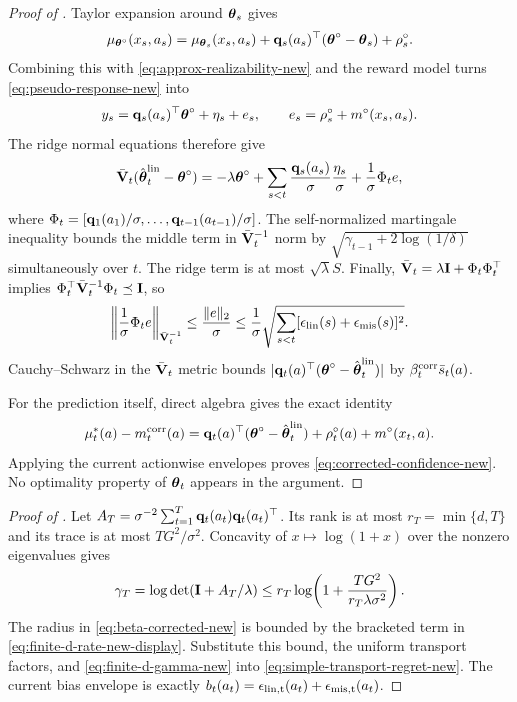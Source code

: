 \begin{proof}[Proof of ]
Taylor expansion around $\boldsymbol{\theta}_s$ gives
\[
 \mu_{\boldsymbol{\theta}^\circ}(x_s,a_s)
 =\mu_{\boldsymbol{\theta}_s}(x_s,a_s)
 +\mathbf{q}_s(a_s)^\top(\boldsymbol{\theta}^\circ-\boldsymbol{\theta}_s)+\rho_s^\circ.
\]
Combining this with \eqref{eq:approx-realizability-new} and the reward model
turns \eqref{eq:pseudo-response-new} into
\[
 y_s=\mathbf{q}_s(a_s)^\top\boldsymbol{\theta}^\circ+\eta_s+e_s,
 \qquad e_s=\rho_s^\circ+m^\circ(x_s,a_s).
\]
The ridge normal equations therefore give
\begin{equation}\label{eq:corrected-normal-equation-proof}
 \bar{\mathbf{V}}_t(\hat{\boldsymbol{\theta}}_t^{\rm lin}-\boldsymbol{\theta}^\circ)
 =-\lambda\boldsymbol{\theta}^\circ
 +\sum_{s<t}\frac{\mathbf{q}_s(a_s)}{\sigma}\frac{\eta_s}{\sigma}
 +\frac1\sigma\Phi_t e,
\end{equation}
where $\Phi_t=[\mathbf{q}_1(a_1)/\sigma,\ldots,
\mathbf{q}_{t-1}(a_{t-1})/\sigma]$.  The self-normalized martingale inequality
bounds the middle term in $\bar{\mathbf{V}}_t^{-1}$ norm by
$\sqrt{\gamma_{t-1}+2\log(1/\delta)}$ simultaneously over $t$.  The ridge
term is at most $\sqrt\lambda S$.  Finally,
$\bar{\mathbf{V}}_t=\lambda\mathbf{I}+\Phi_t\Phi_t^\top$ implies
$\Phi_t^\top\bar{\mathbf{V}}_t^{-1}\Phi_t\preceq\mathbf{I}$, so
\[
 \left\|\frac1\sigma\Phi_t e\right\|_{\bar{\mathbf{V}}_t^{-1}}
 \le\frac{\|e\|_2}{\sigma}
 \le\frac1\sigma\sqrt{\sum_{s<t}
 [\epsilon_{\rm lin}(s)+\epsilon_{\rm mis}(s)]^2}.
\]
Cauchy--Schwarz in the $\bar{\mathbf{V}}_t$ metric bounds
$|\mathbf{q}_t(a)^\top(\boldsymbol{\theta}^\circ-\hat{\boldsymbol{\theta}}_t^{\rm lin})|$ by
$\beta_t^{\rm corr}\bar s_t(a)$.

For the prediction itself, direct algebra gives the exact identity
\[
 \mu_t^*(a)-m_t^{\rm corr}(a)
 =\mathbf{q}_t(a)^\top(\boldsymbol{\theta}^\circ-\hat{\boldsymbol{\theta}}_t^{\rm lin})
 +\rho_t^\circ(a)+m^\circ(x_t,a).
\]
Applying the current actionwise envelopes proves
\eqref{eq:corrected-confidence-new}.  No optimality property of
$\boldsymbol{\theta}_t$ appears in the argument.
\end{proof}

\begin{proof}[Proof of ]
Let
$A_T=\sigma^{-2}\sum_{t=1}^T\mathbf{q}_t(a_t)\mathbf{q}_t(a_t)^\top$.  Its rank is at most
$r_T=\min\{d,T\}$ and its trace is at most $TG^2/\sigma^2$.  Concavity of
$x\mapsto\log(1+x)$ over the nonzero eigenvalues gives
\[
 \gamma_T=\log\det(\mathbf{I}+A_T/\lambda)
 \le r_T\log\!\left(1+\frac{TG^2}{r_T\lambda\sigma^2}\right).
\]
The radius in \eqref{eq:beta-corrected-new} is bounded by the bracketed term in
\eqref{eq:finite-d-rate-new-display}.  Substitute this bound, the uniform
transport factors, and \eqref{eq:finite-d-gamma-new} into
\eqref{eq:simple-transport-regret-new}.  The current bias envelope is exactly
$b_t(a_t)=\epsilon_{\rm lin,t}(a_t)+\epsilon_{\rm mis,t}(a_t)$.
\end{proof}

